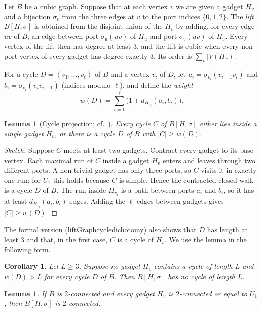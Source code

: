 \documentclass[11pt]{amsart}
\newtheorem{lemma}[theorem]{Lemma}
\newtheorem{corollary}[theorem]{Corollary}
\theoremstyle{definition}
\theoremstyle{remark}
\newcommand{\leanus}{\textunderscore\allowbreak}
\newcommand{\lean}[1]{{\ttfamily\let\_\leanus #1}}
\begin{document}
Let $B$ be a cubic graph. Suppose that at each vertex $v$ we are given a gadget
$H_v$ and a bijection $\sigma_v$ from the three edges at $v$ to the port indices
$\{0,1,2\}$. The \emph{lift} $B[H,\sigma]$ is obtained from the disjoint union
of the $H_v$ by adding, for every edge $uv$ of $B$, an edge between port
$\sigma_u(uv)$ of $H_u$ and port $\sigma_v(uv)$ of $H_v$. Every vertex of the
lift then has degree at least $3$, and the lift is cubic when every non-port
vertex of every gadget has degree exactly $3$. Its order is
$\sum_v |V(H_v)|$.

For a cycle $D=(v_1,\dots,v_\ell)$ of $B$ and a vertex $v_i$ of $D$, let
$a_i=\sigma_{v_i}(v_{i-1}v_i)$ and $b_i=\sigma_{v_i}(v_iv_{i+1})$ (indices
modulo $\ell$), and define the \emph{weight}
\[
  w(D)=\sum_{i=1}^{\ell}\bigl(1+d_{H_{v_i}}(a_i,b_i)\bigr).
\]

\begin{lemma}[Cycle projection; cf.~\cite{Garcia2026,Henry2026}]\label{lem:projection}
Every cycle $C$ of $B[H,\sigma]$ either lies inside a single gadget $H_v$, or
there is a cycle $D$ of $B$ with $|C|\ge w(D)$.
\end{lemma}

\begin{proof}[Sketch]
Suppose $C$ meets at least two gadgets. Contract every gadget to its base
vertex. Each maximal run of $C$ inside a gadget $H_v$ enters and leaves through
two different ports. A non-trivial gadget has only three ports, so $C$ visits
it in exactly one run; for $U_1$ this holds because $C$ is simple. Hence the
contracted closed walk is a cycle $D$ of $B$. The run inside $H_{v_i}$ is a
path between ports $a_i$ and $b_i$, so it has at least $d_{H_{v_i}}(a_i,b_i)$
edges. Adding the $\ell$ edges between gadgets gives $|C|\ge w(D)$.
\end{proof}

The formal version (\lean{liftGraph\_cycle\_dichotomy}) also shows that $D$
has length at least $3$ and that, in the first case, $C$ is a cycle of $H_v$.
We use the lemma in the following form.

\begin{corollary}\label{cor:criterion}
Let $L\ge 3$. Suppose no gadget $H_v$ contains a cycle of length $L$ and
$w(D)>L$ for every cycle $D$ of $B$. Then $B[H,\sigma]$ has no cycle of
length $L$.
\end{corollary}

\begin{lemma}\label{lem:2conn}
If $B$ is $2$-connected and every gadget $H_v$ is $2$-connected or equal to
$U_1$, then $B[H,\sigma]$ is $2$-connected.
\end{lemma}
\end{document}
